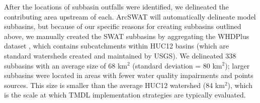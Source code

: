 After the locations of subbasin outfalls were identified, we delineated the contributing area upstream of each.
ArcSWAT will automatically delineate model subbasins, but because of our specific reasons for creating subbasins outlined above, we manually created the SWAT subbasins by aggregating the WHDPlus dataset \citep{wdnr_whdplus_2013}, which contains subcatchments within HUC12 basins (which are standard watersheds created and maintained by USGS). 
We delineated 338 subbasins with an average size of 68 km$^2$ (standard deviation = 80 km$^2$); larger subbasins were located in areas with fewer water quality impairments and points sources. This size is smaller than the average HUC12 watershed (84 km$^2$), which is the scale at which TMDL implementation strategies are typically evaluated.




